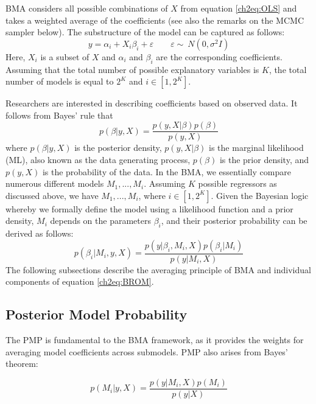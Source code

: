 \begin{refsection}
\ac{BMA} considers all possible combinations of $X$ from equation \ref{ch2eq:OLS} and takes a weighted average of the coefficients (see also the remarks on the \ac{MCMC} sampler below). The substructure of the model can be captured as follows:
%
\begin{equation}\label{ch2eq:OLSsub}
	y = \alpha_{i} + X_{i}\beta_{i}+ \varepsilon \qquad \varepsilon  \sim\ N(0, \sigma^{2}I)
\end{equation}
%
Here, $X_{i}$ is a subset of $X$ and $\alpha_{i} $ and $ \beta_{i}$ are the corresponding coefficients. Assuming that the total number of possible explanatory variables is $K$, the total number of models is equal to $2^{K}$ and $i \in [1,2^{K}]$. 

Researchers are interested in describing coefficients based on observed data. It follows from Bayes' rule that
%
\begin{equation}\label{ch2eq:BRmodel}
	p(\beta \vert y,X) = \frac{p(y,X\vert \beta)p(\beta)}{p(y,X)}
\end{equation}
where $p(\beta \vert y, X)$ is the posterior density, $p(y, X\vert \beta)$ is the marginal likelihood (ML), also known as the data generating process, $p(\beta)$ is the prior density, and $p(y,X)$ is the probability of the data. In the \ac{BMA}, we essentially compare numerous different models $M_{1},...,M_{i}$.  Assuming $K$ possible regressors as discussed above, we have $M_{1},...,M_{i}$, where $i \in [1,2^{K}]$. Given the Bayesian logic whereby we formally define the model using a likelihood function and a prior density, $M_{i}$ depends on the parameters $\beta_{i}$, and their posterior probability can be derived as follows:
\begin{equation}\label{ch2eq:BROM}
	p(\beta_{i} \vert M_{i},y,X) = \frac{p(y\vert \beta_{i},M_{i},X)p(\beta_{i}\vert M_{i})}{p(y \vert M_{i},X)}
\end{equation}
The following subsections describe the averaging principle of \ac{BMA} and individual components of equation \ref{ch2eq:BROM}.
%
\subsection{Posterior Model Probability}
%
The \ac{PMP} is fundamental to the \ac{BMA} framework, as it provides the weights for averaging model coefficients across submodels. \ac{PMP} also arises from Bayes' theorem:

\begin{equation}\label{ch2eq:PMPmain}
	p(M_{i} \vert y,X) = \frac{p(y\vert M_{i},X)p(M_{i})}{p(y \vert X)}
\end{equation}


\end{refsection}
